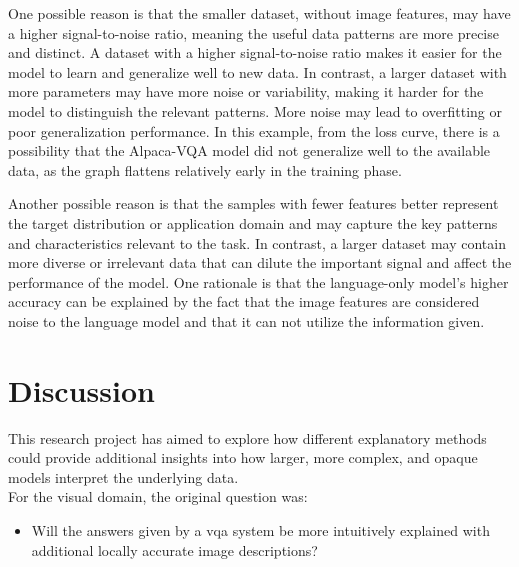         One possible reason is that the smaller dataset, without image features, may have a higher signal-to-noise ratio, meaning the useful data patterns are more precise and distinct. A dataset with a higher signal-to-noise ratio makes it easier for the model to learn and generalize well to new data. In contrast, a larger dataset with more parameters may have more noise or variability, making it harder for the model to distinguish the relevant patterns. 
        More noise may lead to overfitting or poor generalization performance. In this example, from the loss curve, there is a possibility that the Alpaca-VQA model did not generalize well to the available data, as the graph flattens relatively early in the training phase.
        
        Another possible reason is that the samples with fewer features better represent the target distribution or application domain and may capture the key patterns and characteristics relevant to the task. In contrast, a larger dataset may contain more diverse or irrelevant data that can dilute the important signal and affect the performance of the model. One rationale is that the language-only model's higher accuracy can be explained by the fact that the image features are considered noise to the language model and that it can not utilize the information given.

          
        

      

\section{Discussion}
\label{4_discussion}


This research project has aimed to explore how different explanatory methods could provide additional insights into how larger, more complex, and opaque models interpret the underlying data.\\
For the visual domain, the original question was:
\begin{itemize}
    \item Will the answers given by a \gls{vqa} system be more intuitively explained with additional locally accurate image descriptions?
\end{itemize}

